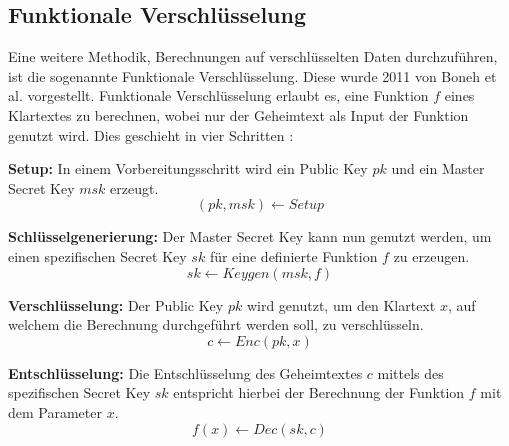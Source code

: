 \subsection{Funktionale Verschlüsselung}\label{sec:funktionale_verschlüsselung}

Eine weitere Methodik, Berechnungen auf verschlüsselten Daten durchzuführen, ist die sogenannte Funktionale Verschlüsselung.
Diese wurde 2011 von Boneh et al. \cite{P-44} vorgestellt.
Funktionale Verschlüsselung erlaubt es, eine Funktion $f$ eines Klartextes zu berechnen, wobei nur der Geheimtext als Input der Funktion genutzt wird.
Dies geschieht in vier Schritten \cite{P-44}:
\begin{compactenum}
    \item \textbf{Setup: } In einem Vorbereitungsschritt wird ein Public Key $pk$ und ein Master Secret Key $msk$ erzeugt.
    \begin{equation*}
        (pk, msk) \xleftarrow{} Setup
    \end{equation*}
    \item \textbf{Schlüsselgenerierung: } Der Master Secret Key kann nun genutzt werden, um einen spezifischen Secret Key $sk$ für eine definierte Funktion $f$ zu erzeugen.
    \begin{equation*}
        sk \xleftarrow{} Keygen(msk, f)
    \end{equation*}
    \item \textbf{Verschlüsselung: } Der Public Key $pk$ wird genutzt, um den Klartext $x$, auf welchem die Berechnung durchgeführt werden soll, zu verschlüsseln.
    \begin{equation*}
        c \xleftarrow{} Enc(pk,x)
    \end{equation*}
    \item \textbf{Entschlüsselung: } Die Entschlüsselung des Geheimtextes $c$ mittels des spezifischen Secret Key $sk$ entspricht hierbei der Berechnung der Funktion $f$ mit dem Parameter $x$.
    \begin{equation*}
        f(x) \xleftarrow{} Dec(sk,c)
    \end{equation*}
\end{compactenum}

